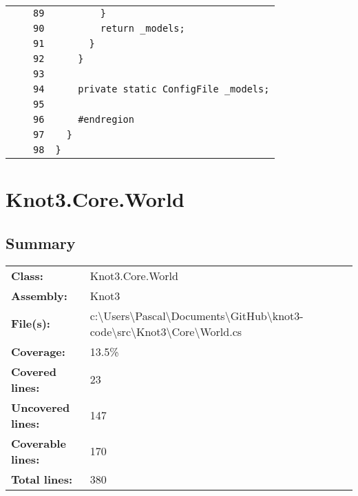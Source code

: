 \documentclass[a4paper,10pt]{article}
\begin{document}
\begin{longtable}[l]{lrrl}
\cellcolor{gray} &  & \verb~89~ & \verb~        }~\\
\cellcolor{gray} &  & \verb~90~ & \verb~        return _models;~\\
\cellcolor{gray} &  & \verb~91~ & \verb~      }~\\
\cellcolor{gray} &  & \verb~92~ & \verb~    }~\\
\cellcolor{gray} &  & \verb~93~ & \verb~~\\
\cellcolor{gray} &  & \verb~94~ & \verb~    private static ConfigFile _models;~\\
\cellcolor{gray} &  & \verb~95~ & \verb~~\\
\cellcolor{gray} &  & \verb~96~ & \verb~    #endregion~\\
\cellcolor{gray} &  & \verb~97~ & \verb~  }~\\
\cellcolor{gray} &  & \verb~98~ & \verb~}~\\
\end{longtable}
\newpage
\section{Knot3.Core.World}
\subsection{Summary}
\begin{longtable}[l]{ll}
\textbf{Class:} & Knot3.Core.World\\
\textbf{Assembly:} & Knot3\\
\textbf{File(s):} & \begin{minipage}[t]{12cm}{c:\textbackslash Users\textbackslash Pascal\textbackslash Documents\textbackslash GitHub\textbackslash knot3-code\textbackslash src\textbackslash Knot3\textbackslash Core\textbackslash World.cs}\end{minipage} \\
\textbf{Coverage:} & 13.5\%\\
\textbf{Covered lines:} & 23\\
\textbf{Uncovered lines:} & 147\\
\textbf{Coverable lines:} & 170\\
\textbf{Total lines:} & 380\\
\end{longtable}
\end{document}
